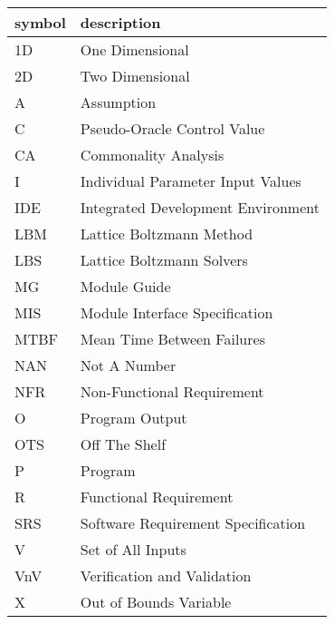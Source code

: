 \documentclass[12pt, titlepage]{article}
\begin{document}
\renewcommand{\arraystretch}{1.2}
\begin{tabular}{l l} 
  \toprule		
  \textbf{symbol} & \textbf{description}\\
  \midrule 
  1D & One Dimensional\\
  2D & Two Dimensional\\
  A & Assumption\\
  C & Pseudo-Oracle Control Value\\
  CA & Commonality Analysis\\
  I & Individual Parameter Input Values\\
  IDE & Integrated Development Environment\\
  LBM & Lattice Boltzmann Method\\
  LBS & Lattice Boltzmann Solvers\\
  MG & Module Guide\\
  MIS & Module Interface Specification\\
  MTBF & Mean Time Between Failures\\
  NAN & Not A Number\\
  NFR & Non-Functional Requirement\\
  O & Program Output\\
  OTS & Off The Shelf\\
  P & Program\\
  R & Functional Requirement\\
  SRS & Software Requirement Specification\\
  V & Set of All Inputs\\
  VnV & Verification and Validation\\
  X & Out of Bounds Variable\\
  \bottomrule
\end{tabular}\\

\newpage
\end{document}
